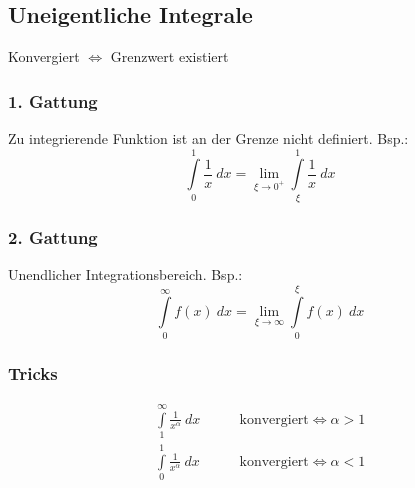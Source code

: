 \subsection{Uneigentliche Integrale}
    \begin{center}
        Konvergiert $\Longleftrightarrow$ Grenzwert existiert
    \end{center}
    
    \subsubsection{1. Gattung}
            Zu integrierende Funktion ist an der Grenze nicht definiert. Bsp.:
            $$
                \int\limits_{0}^{1}  \frac{1}{x} \ dx = \lim_{\xi \to 0^+} \int\limits_{\xi}^{1} \frac{1}{x} \ dx
            $$
    \subsubsection{2. Gattung}
        Unendlicher Integrationsbereich. Bsp.:
        $$
            \int\limits_{0}^{\infty}  f(x) \ dx = \lim_{\xi \to \infty}\int\limits_{0}^{\xi} f(x) \ dx
        $$
    \subsubsection{Tricks}
        \vspace{-0.5em}
        \begin{align*}
            \int\limits_{1}^{\infty}  \frac{1}{x^\alpha} \ dx  \qquad &\text{konvergiert} \iff \alpha > 1\\
            \int\limits_{0}^{1}  \frac{1}{x^\alpha} \ dx  \qquad &\text{konvergiert} \iff \alpha < 1  
        \end{align*}